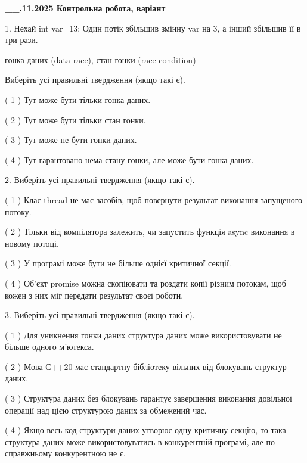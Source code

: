 \documentclass[12pt, ukrainian]{article}
\begin{document}
\newpage
\begin {large}

\textbf{\_\_.11.2025 Контрольна робота, варіант  }\par


{
1. Нехай int var=13; Один потік збільшив змінну var на 3, а інший збільшив її в три рази.

гонка даних (data race), стан гонки (race condition)

Виберіть усі правильні твердження (якщо такі є).\par
\vspace{2mm}
( 1 ) Тут може бути тільки гонка даних.%

( 2 ) Тут може бути тільки стан гонки.%

( 3 ) Тут може не бути гонки даних.%

( 4 ) Тут гарантовано нема стану гонки, але може бути гонка даних.%


2. Виберіть усі правильні твердження (якщо такі є).\par
\vspace{2mm}

( 1 ) Клас thread не має засобів, щоб повернути результат виконання запущеного потоку.%

( 2 ) Тільки від компілятора залежить, чи запустить функція async виконання в новому потоці.%

( 3 ) У програмі може бути не більше однієї критичної секції.%

( 4 ) Об’єкт promise можна скопіювати та роздати копії різним потокам, щоб кожен з них міг передати результат своєї роботи.%


3. Виберіть усі правильні твердження (якщо такі є).\par
\vspace{2mm}

( 1 ) Для уникнення гонки даних структура даних може використовувати не більше одного м’ютекса.%

( 2 ) Мова С++20 має стандартну бібліотеку вільних від блокувань структур даних.%

( 3 ) Структура даних без блокувань гарантує завершення виконання довільної операції над цією структурою даних за обмежений час.%

( 4 ) Якщо весь код структури даних утворює одну критичну секцію, то така структура даних може використовуватись в конкурентній програмі, але по-справжньо\-му конкурентною не є.%


}
\end{large}
\end{document}
